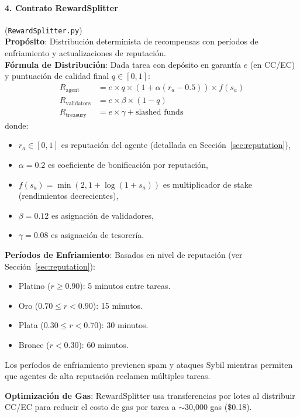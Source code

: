 \documentclass[11pt]{article}
\begin{document}
\paragraph{4. Contrato RewardSplitter} (\texttt{RewardSplitter.py})\\
\textbf{Propósito}: Distribución determinista de recompensas con períodos de enfriamiento y actualizaciones de reputación.\\
\textbf{Fórmula de Distribución}: Dada tarea con depósito en garantía $e$ (en CC/EC) y puntuación de calidad final $q \in [0,1]$:
\begin{align}
R_{\text{agent}} &= e \times q \times \left(1 + \alpha (r_a - 0.5)\right) \times f(s_a) \label{eq:reward-agent} \\
R_{\text{validators}} &= e \times \beta \times (1-q) \label{eq:reward-validators} \\
R_{\text{treasury}} &= e \times \gamma + \text{slashed funds} \label{eq:reward-treasury}
\end{align}
donde:
\begin{itemize}[noitemsep]
  \item $r_a \in [0,1]$ es reputación del agente (detallada en Sección~\ref{sec:reputation}),
  \item $\alpha = 0.2$ es coeficiente de bonificación por reputación,
  \item $f(s_a) = \min(2, 1 + \log(1+s_a))$ es multiplicador de stake (rendimientos decrecientes),
  \item $\beta = 0.12$ es asignación de validadores,
  \item $\gamma = 0.08$ es asignación de tesorería.
\end{itemize}
\textbf{Períodos de Enfriamiento}: Basados en nivel de reputación (ver Sección~\ref{sec:reputation}):
\begin{itemize}[noitemsep]
  \item Platino ($r \geq 0.90$): 5 minutos entre tareas.
  \item Oro ($0.70 \leq r < 0.90$): 15 minutos.
  \item Plata ($0.30 \leq r < 0.70$): 30 minutos.
  \item Bronce ($r < 0.30$): 60 minutos.
\end{itemize}
Los períodos de enfriamiento previenen spam y ataques Sybil mientras permiten que agentes de alta reputación reclamen múltiples tareas.

\textbf{Optimización de Gas}: RewardSplitter usa transferencias por lotes al distribuir CC/EC para reducir el costo de gas por tarea a $\sim$30,000 gas (\$0.18).
\end{document}
